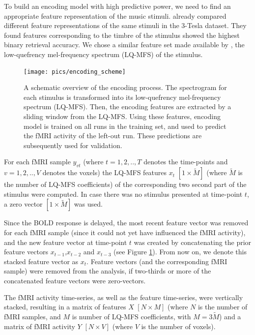 To build an encoding model with high predictive power, we need to find an
appropriate feature representation of the music stimuli.  \citet{CTK+2012}
already compared different feature representations of the same stimuli in the
3-Tesla dataset. They found features corresponding to the timbre of the stimulus
showed the highest binary retrieval accuracy.
We chose a similar feature set made available by \citet{HDH+2015}, the low-quefrency
mel-frequency spectrum (LQ-MFS) of the stimulus.

\begin{figure}
  \centering
  \texttt{[image: pics/encoding\_scheme]}

  \caption{A schematic overview of the encoding process. The spectrogram for
	  each stimulus is transformed into its low-quefrency mel-frequency
	  spectrum (LQ-MFS). Then, the encoding features are extracted by a
  sliding window from the LQ-MFS. Using these features, encoding model is trained on all runs in
  the training set, and used to predict the f{MRI} activity of the left-out run.
  These predictions are subsequently used for validation.}

 \label{fig:encoding_scheme}
\end{figure}


For each f{MRI} sample $y_{vt}$ (where $t=1,2,..,T$ denotes the time-points and
$v=1,2,..,V$ denotes the voxels) the LQ-MFS features $x_{t}$ $[1\times\widetilde{M}]$
(where $\widetilde{M}$ is the number of LQ-MFS coefficients) of the
corresponding two second part of the stimulus were computed. In case there was
no stimulus presented at time-point $t$, a zero vector $[1\times\widetilde{M}]$ was
used. 

Since the BOLD response is delayed,  the most recent feature vector was removed
for each f{MRI} sample (since it could not yet have influenced the f{MRI}
activity), and the new feature vector at time-point $t$ was created by
concatenating the prior feature vectors $x_{t-1}$,$x_{t-2}$ and $x_{t-3}$
(see Figure \ref{fig:encoding_scheme}). From
now on, we denote this stacked feature vector as $x_{t}$.
Feature vectors (and the corresponding f{MRI} sample) were removed from the
analysis, if two-thirds or more of the concatenated feature vectors were
zero-vectors.

The f{MRI} activity time-series, as well as the feature time-series, were
vertically stacked, resulting in a matrix of features $X$ $[N\times M]$ (where $N$ is
the number of f{MRI} samples, and $M$ is number of LQ-MFS coefficients, with
$M=3\widetilde{M}$) and a matrix of f{MRI} activity $Y$ $[N\times V]$ (where $V$ is
the number of voxels).

